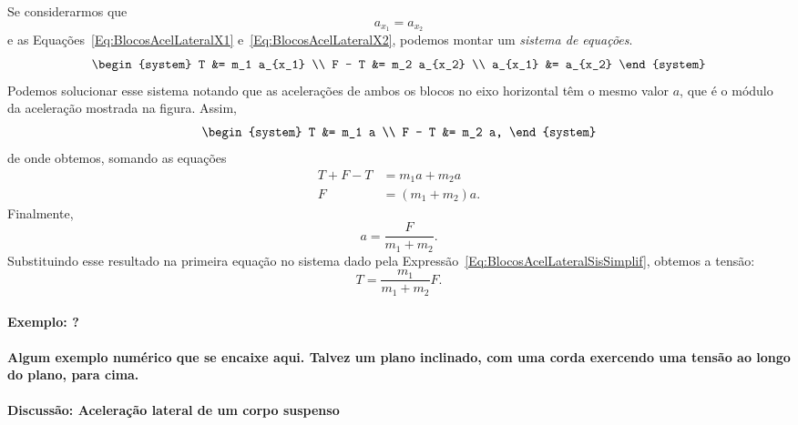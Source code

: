 Se considerarmos que
\begin{equation}
    a_{x_1} = a_{x_2}
\end{equation}
%
e as Equações~\ref{Eq:BlocosAcelLateralX1} e~\ref{Eq:BlocosAcelLateralX2}, podemos montar um \emph{sistema de equações}.
\begin{equation}
\begin{system}
    T &= m_1 a_{x_1} \\
    F - T &= m_2 a_{x_2} \\
    a_{x_1} &= a_{x_2}
\end{system}
\end{equation}
%
Podemos solucionar esse sistema notando que as acelerações de ambos os blocos no eixo horizontal têm o mesmo valor $a$, que é o módulo da aceleração mostrada na figura. Assim,
\begin{equation}\label{Eq:BlocosAcelLateralSisSimplif}
\begin{system}
    T &= m_1 a \\
    F - T &= m_2 a,
\end{system}
\end{equation}
%
de onde obtemos, somando as equações
\begin{align}
    T + F - T &= m_1 a + m_2 a \\
    F &= (m_1 + m_2)a.
\end{align}
%
Finalmente,
\begin{equation}
    a = \frac{F}{m_1 + m_2}.
\end{equation}
%
Substituindo esse resultado na primeira equação no sistema dado pela Expressão~\eqref{Eq:BlocosAcelLateralSisSimplif}, obtemos a tensão:
\begin{equation}
    T = \frac{m_1}{m_1 + m_2} F.
\end{equation}

\paragraph{Exemplo: ?}

\textbf{Algum exemplo numérico que se encaixe aqui. Talvez um plano inclinado, com uma corda exercendo uma tensão ao longo do plano, para cima.}

\paragraph{Discussão: Aceleração lateral de um corpo suspenso}

